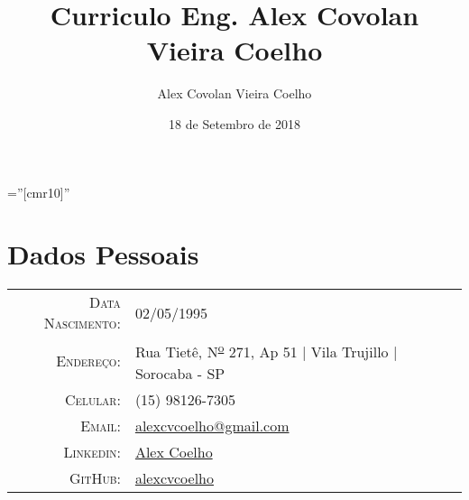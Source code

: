 \documentclass[a4paper,10pt]{article}
\title{Curriculo Eng. Alex Covolan Vieira Coelho}
\date{18 de Setembro de 2018}
\author{Alex Covolan Vieira Coelho}
\begin{document}
\pagestyle{empty} %

\font\fb=''[cmr10]'' %

\par{\bigskip\par}

\section{Dados Pessoais}

\begin{tabular}{rl}
    \textsc{Data Nascimento:} & 02/05/1995 \\
    \textsc{Endereço:}   & Rua Tietê, N\textsuperscript{\underline{o}} 271, Ap 51 | Vila Trujillo | Sorocaba - SP \\
    \textsc{Celular:}     & (15) 98126-7305\\
    \textsc{Email:}     & \href{mailto:alexcvcoelho@gmail.com}{alexcvcoelho@gmail.com} \\
    \textsc{Linkedin:} & \href{https://www.linkedin.com/in/alex-coelho-475654a3/}{Alex Coelho} \\
    \textsc{GitHub:} & \href{https://github.com/alexcvcoelho}{alexcvcoelho}
\end{tabular}

\end{document}
